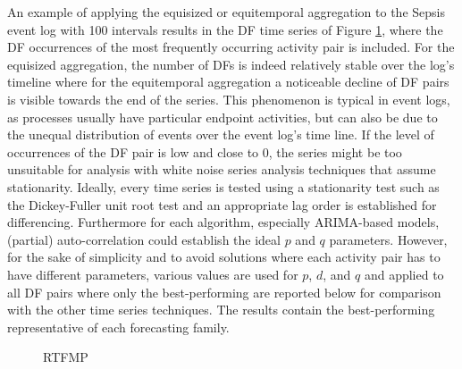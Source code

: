 An example of applying the equisized or equitemporal aggregation to the Sepsis event log with 100 intervals results in the DF time series of Figure \ref{fig:sepsists}, where the DF occurrences of the most frequently occurring activity pair is included.
For the equisized aggregation, the number of DFs is indeed relatively stable over the log's timeline where for the equitemporal aggregation a noticeable decline of DF pairs is visible towards the end of the series.
This phenomenon is typical in event logs, as processes usually have particular endpoint activities, but can also be due to the unequal distribution of events over the event log's time line.
If the level of occurrences of the DF pair is low and close to 0, the series might be too unsuitable for analysis with white noise series analysis techniques that assume stationarity.
Ideally, every time series is tested using a stationarity test such as the Dickey-Fuller unit root test \cite{leybourne1995testing} and an appropriate lag order is established for differencing. 
Furthermore for each algorithm, especially ARIMA-based models, (partial) auto-correlation could establish the ideal $p$ and $q$ parameters.
However, for the sake of simplicity and to avoid solutions where each activity pair has to have different parameters, various values are used for $p$, $d$, and $q$ and applied to all DF pairs where only the best-performing are reported below for comparison with the other time series techniques.
The results contain the best-performing representative of each forecasting family.
\begin{figure}[tb]
	\centering
	\caption{RTFMP}
	\label{fig:sepsists}
\end{figure}

